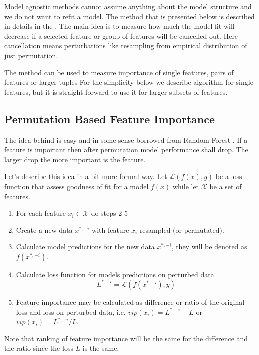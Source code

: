 \documentclass[]{krantz}
\providecommand{\tightlist}{%
  \setlength{\itemsep}{0pt}\setlength{\parskip}{0pt}}
\theoremstyle{definition}
\theoremstyle{definition}
\theoremstyle{definition}
\theoremstyle{remark}
\begin{document}
Model agnostic methods cannot assume anything about the model structure
and we do not want to refit a model. The method that is presented below
is described in details in the \citep{variableImportancePermutations}.
The main idea is to measure how much the model fit will decrease if a
selected feature or group of features will be cancelled out. Here
cancellation means perturbations like resampling from empirical
distribution of just permutation.

The method can be used to measure importance of single features, pairs
of features or larger tuples For the simplicity below we describe
algorithm for single features, but it is straight forward to use it for
larger subsets of features.

\hypertarget{permutation-based-feature-importance}{%
\subsection{Permutation Based Feature
Importance}\label{permutation-based-feature-importance}}

The idea behind is easy and in some sense borrowed from Random Forest
\citep{R-randomForest}. If a feature is important then after permutation
model performance shall drop. The larger drop the more important is the
feature.

Let's describe this idea in a bit more formal way. Let
\(\mathcal L(f(x), y)\) be a loss function that assess goodness of fit
for a model \(f(x)\) while let \(\mathcal X\) be a set of features.

\begin{enumerate}
\def\labelenumi{\arabic{enumi}.}
\tightlist
\item
  For each feature \(x_i \in \mathcal X\) do steps 2-5
\item
  Create a new data \(x^{*,-i}\) with feature \(x_i\) resampled (or
  permutated).
\item
  Calculate model predictions for the new data \(x^{*,-i}\), they will
  be denoted as \(f(x^{*,-i})\).
\item
  Calculate loss function for models predictions on perturbed data \[
  L^{*,-i} = \mathcal L(f(x^{*,-i}), y)
  \]
\item
  Feature importance may be calculated as difference or ratio of the
  original loss and loss on perturbed data, i.e.
  \(vip(x_i) = L^{*,-i} - L\) or \(vip(x_i) = L^{*,-i} / L\).
\end{enumerate}

Note that ranking of feature importance will be the same for the
difference and the ratio since the loss \(L\) is the same.
\end{document}
